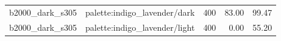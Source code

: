 \begin{longtable}{l>{\raggedright\arraybackslash}p{.42\linewidth}rrr}
b2000\_\allowbreak{}dark\_\allowbreak{}s305 & %
palette:indigo\_\allowbreak{}lavender/dark & %
400 & %
83.00 & %
99.47 \\ %

b2000\_\allowbreak{}dark\_\allowbreak{}s305 & %
palette:indigo\_\allowbreak{}lavender/light & %
400 & %
0.00 & %
55.20 \\ %


\end{longtable}
